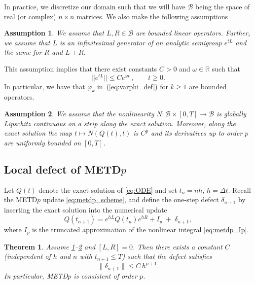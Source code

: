 \documentclass[12pt]{article}
\newtheorem{thm}{Theorem}
\newtheorem{asp}{Assumption}
\begin{document}
In practice, we discretize our domain such that we will have $\mathcal{B}$ being the space of real (or complex) $n \times n$ matrices. We also make the following assumptions

\begin{asp}
    \label{asm:ass1}
    We assume that $L,R\in \mathcal B$ are bounded linear operators. Further, we assume that $L$ is an infinitesimal generator of an analytic semigroup $e^{tL}$ and the same for $R$ and $L+R$.
\end{asp}
This assumption implies that there exist constants $C>0$ and $\omega \in \mathbb{R}$ such that
\begin{equation}
    ||e^{tL}|| \leq C e^{\omega t}\, ,\qquad t \geq 0. 
\end{equation}
In particular, we have that $\varphi_k$ in~(\ref{eq:varphi_def}) for $k\geq1$ are bounded operators. 

\begin{asp}
    \label{asm:ass2}
    We assume that the nonlinearity $N : \mathcal{B} \times [0,T] \to \mathcal{B}$ is globally Lipschitz continuous on a strip along the exact solution. Moreover, along the exact solution the map $t\mapsto N(Q(t),t)$ is $C^{p}$ and its derivatives up to order $p$ are uniformly bounded on $[0,T]$.
\end{asp}

\subsection{Local defect of METD\texorpdfstring{$p$}{p}}

Let $Q(t)$ denote the exact solution of \eqref{eq:ODE} and set $t_n=nh$, $h=\Delta t$.
Recall the METD$p$ update \eqref{eq:metdp_scheme}, and define the one-step defect $\delta_{n+1}$ by inserting the exact solution into the numerical update
\begin{equation*}
Q(t_{n+1}) = e^{hL}Q(t_n)e^{hR} + I_p \;+\; \delta_{n+1},
\end{equation*}
where $I_p$ is the truncated approximation of the nonlinear integral \eqref{eq:metdp_Ip}.

\begin{thm}
\label{thm:metdp_local}
Assume \ref{asm:ass1}--\ref{asm:ass2} and $[L,R]=0$. Then there exists a constant $C$ (independent of $h$ and $n$ with $t_{n+1}\le T$) such that the defect satisfies
\begin{equation*}
\|\delta_{n+1}\|\le C\,h^{p+1}.
\end{equation*}
In particular, METD$p$ is consistent of order $p$.
\end{thm}
\end{document}
